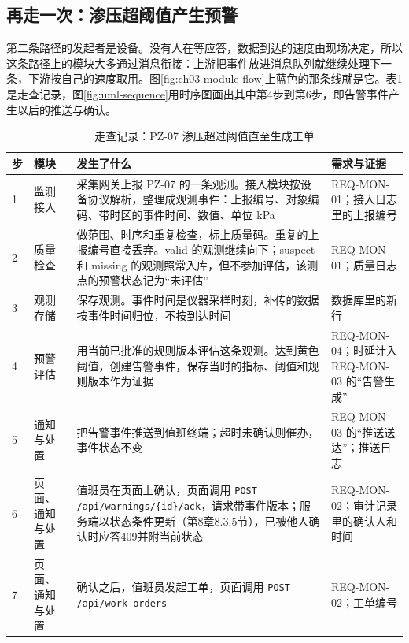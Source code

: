 \subsection{再走一次：渗压超阈值产生预警}

第二条路径的发起者是设备。没有人在等应答，数据到达的速度由现场决定，所以这条路径上的模块大多通过消息衔接：上游把事件放进消息队列就继续处理下一条，下游按自己的速度取用。图\ref{fig:ch03-module-flow}上蓝色的那条线就是它。表\ref{tab:ch03-walk-warning}是走查记录，图\ref{fig:uml-sequence}用时序图画出其中第4步到第6步，即告警事件产生以后的推送与确认。

\begin{table}[htbp]
\centering
\caption{走查记录：PZ-07 渗压超过阈值直至生成工单}
\label{tab:ch03-walk-warning}
\begin{tabular}{p{0.6cm}p{2.2cm}p{6.6cm}p{4.0cm}}
\toprule
步 & 模块 & 发生了什么 & 需求与证据 \\
\midrule
1 & 监测接入 & 采集网关上报 PZ-07 的一条观测。接入模块按设备协议解析，整理成观测事件：上报编号、对象编码、带时区的事件时间、数值、单位 kPa & REQ-MON-01；接入日志里的上报编号 \\
2 & 质量检查 & 做范围、时序和重复检查，标上质量码。重复的上报编号直接丢弃。valid 的观测继续向下；suspect 和 missing 的观测照常入库，但不参加评估，该测点的预警状态记为“未评估” & REQ-MON-01；质量日志 \\
3 & 观测存储 & 保存观测。事件时间是仪器采样时刻，补传的数据按事件时间归位，不按到达时间 & 数据库里的新行 \\
4 & 预警评估 & 用当前已批准的规则版本评估这条观测。达到黄色阈值，创建告警事件，保存当时的指标、阈值和规则版本作为证据 & REQ-MON-04；时延计入 REQ-MON-03 的“告警生成” \\
5 & 通知与处置 & 把告警事件推送到值班终端；超时未确认则催办，事件状态不变 & REQ-MON-03 的“推送送达”；推送日志 \\
6 & 页面、通知与处置 & 值班员在页面上确认，页面调用 \texttt{POST /api/warnings/}\allowbreak\texttt{\{id\}/ack}，请求带事件版本；服务端以状态条件更新（第8章8.3.5节），已被他人确认时应答409并附当前状态 & REQ-MON-02；审计记录里的确认人和时间 \\
7 & 页面、通知与处置 & 确认之后，值班员发起工单，页面调用 \texttt{POST /api/work-orders} & REQ-MON-02；工单编号 \\
\bottomrule
\end{tabular}
\end{table}

